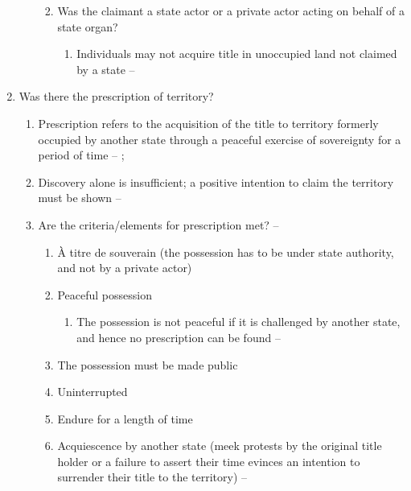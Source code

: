 \begin{enumerate}
\begin{enumerate}
\begin{enumerate}
\begin{enumerate}
            \end{enumerate}
            \item Was the claimant a state actor or a private actor acting on behalf of a state organ?
            \begin{enumerate}
                \item Individuals may not acquire title in unoccupied land not claimed by a state -- 
            \end{enumerate}
        \end{enumerate}
    \end{enumerate}
    \item Was there the prescription of territory?
    \begin{enumerate}
        \item Prescription refers to the acquisition of the title to territory formerly occupied by another state through a peaceful exercise of sovereignty for a period of time -- ; 
        \item Discovery alone is insufficient; a positive intention to claim the territory must be shown -- 
        \item Are the criteria/elements for prescription met? -- 
        \begin{enumerate}
            \item À titre de souverain (the possession has to be under state authority, and not by a private actor)
            \item Peaceful possession
            \begin{enumerate}
                \item The possession is not peaceful if it is challenged by another state, and hence no prescription can be found -- 
            \end{enumerate}
            \item The possession must be made public
            \item Uninterrupted
            \item Endure for a length of time
            \item Acquiescence by another state (meek protests by the original title holder or a failure to assert their time evinces an intention to surrender their title to the territory) -- 

\end{enumerate}
\end{enumerate}
\end{enumerate}
